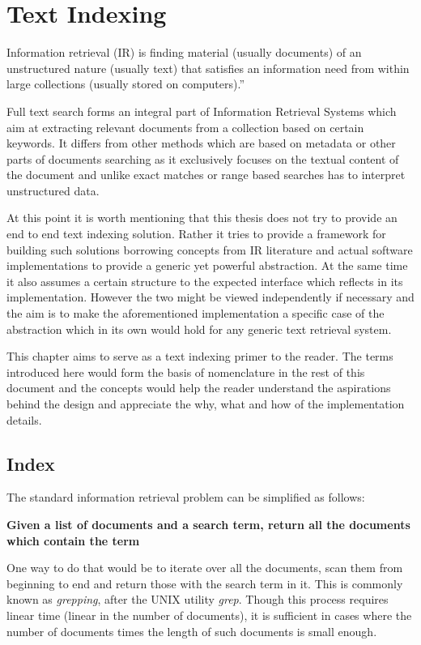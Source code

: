 \chapter{Text Indexing}
\label{chap:textIndexing}

\begin{displayquote}
Information retrieval (IR) is finding material (usually documents) of an unstructured nature (usually text)
that satisfies an information need from within large collections (usually stored on computers).''\cite{IRBook}
\end{displayquote}

Full text search forms an integral part of Information Retrieval Systems which aim at extracting
relevant documents from a collection based on certain keywords.
It differs from other methods which are based on metadata or other parts of documents searching as it exclusively focuses on the
textual content of the document and unlike exact matches or range based searches has to interpret unstructured data.

At this point it is worth mentioning that this thesis does not try to provide an end to end text indexing solution.
Rather it tries to provide a framework for building such solutions borrowing concepts from IR literature and actual software
implementations to provide a generic yet powerful abstraction.
At the same time it also assumes a certain structure to the expected interface which reflects in its implementation.
However the two might be viewed independently if necessary and the aim is to make the aforementioned implementation a specific
case of the abstraction which in its own would hold for any generic text retrieval system.

This chapter aims to serve as a text indexing primer to the reader.
The terms introduced here would form the basis of nomenclature in the rest of this document and
the concepts would help the reader understand the aspirations behind the design and appreciate the why, what and how
of the implementation details.

\section{Index}
The standard information retrieval problem can be simplified as follows:

\noindent \textbf{Given a list of documents and a search term, return all the documents which contain the term}

One way to do that would be to iterate over all the documents, scan them from beginning to end and return those with the search term in it.
This is commonly known as \textit{grepping}, after the UNIX utility \textit{grep}.
Though this process requires linear time (linear in the number of documents),
it is sufficient in cases where the number of documents times the length of such documents is small enough.

